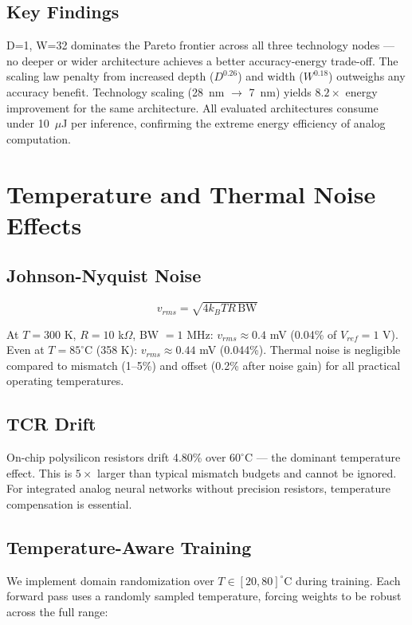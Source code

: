 \documentclass[10pt,twocolumn]{article}
\begin{document}
\subsection{Key Findings}

D=1, W=32 dominates the Pareto frontier across all three technology nodes --- no deeper or wider architecture achieves a better accuracy-energy trade-off. The scaling law penalty from increased depth ($D^{0.26}$) and width ($W^{0.18}$) outweighs any accuracy benefit. Technology scaling (28~nm $\to$ 7~nm) yields $8.2\times$ energy improvement for the same architecture. All evaluated architectures consume under 10~$\mu$J per inference, confirming the extreme energy efficiency of analog computation.

\section{Temperature and Thermal Noise Effects}

\subsection{Johnson-Nyquist Noise}

\begin{equation}
v_{rms} = \sqrt{4 k_B T R \, \text{BW}}
\end{equation}

At $T = 300$ K, $R = 10$ k$\Omega$, BW $= 1$ MHz: $v_{rms} \approx 0.4$ mV (0.04\% of $V_{ref} = 1$ V). Even at $T = 85^\circ$C (358 K): $v_{rms} \approx 0.44$ mV (0.044\%). Thermal noise is negligible compared to mismatch (1--5\%) and offset (0.2\% after noise gain) for all practical operating temperatures.

\subsection{TCR Drift}

On-chip polysilicon resistors drift 4.80\% over $60^\circ$C --- the dominant temperature effect. This is $5\times$ larger than typical mismatch budgets and cannot be ignored. For integrated analog neural networks without precision resistors, temperature compensation is essential.

\subsection{Temperature-Aware Training}

We implement domain randomization over $T \in [20, 80]^\circ$C during training. Each forward pass uses a randomly sampled temperature, forcing weights to be robust across the full range:
\end{document}
